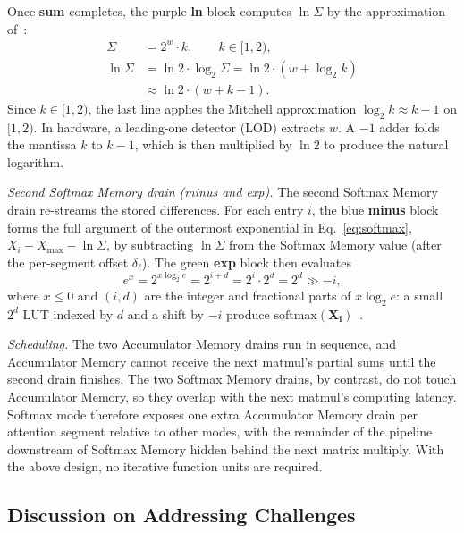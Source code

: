 \documentclass[lettersize,journal]{IEEEtran}
\begin{document}
Once \textbf{sum} completes, the purple \textbf{ln} block computes $\ln \Sigma$ by the approximation of~\cite{meiqi2018softmax}:
\begin{equation}
\begin{aligned}
    \Sigma      &= 2^{w} \cdot k, \qquad k \in [1, 2), \\
    \ln \Sigma  &= \ln 2 \cdot \log_{2} \Sigma = \ln 2 \cdot (w + \log_{2} k) \\
                &\approx \ln 2 \cdot (w + k - 1).
\end{aligned}
\label{eq:loge}
\end{equation}
Since $k \in [1, 2)$, the last line applies the Mitchell approximation $\log_{2} k \approx k - 1$ on $[1, 2)$. In hardware, a leading-one detector (LOD) extracts $w$. A $-1$ adder folds the mantissa $k$ to $k{-}1$, which is then multiplied by $\ln 2$ to produce the natural logarithm.

\emph{Second Softmax Memory drain (minus and exp).} The second Softmax Memory drain re-streams the stored differences. For each entry $i$, the blue \textbf{minus} block forms the full argument of the outermost exponential in Eq.~\eqref{eq:softmax}, $X_i - X_{\max} - \ln \Sigma$, by subtracting $\ln \Sigma$ from the Softmax Memory value (after the per-segment offset $\delta_{\ell}$). The green \textbf{exp} block then evaluates
\begin{equation}
    e^{x} = 2^{x \log_{2} e} = 2^{i+d} = 2^{i} \cdot 2^{d} = 2^{d} \gg -i,
    \label{eq:exp}
\end{equation}
where $x \le 0$ and $(i, d)$ are the integer and fractional parts of $x \log_{2} e$: a small $2^{d}$ LUT indexed by $d$ and a shift by $-i$ produce $\mathrm{softmax}(\mathbf{X_i})$~\cite{meiqi2018softmax}.

\emph{Scheduling.} The two Accumulator Memory drains run in sequence, and Accumulator Memory cannot %
receive the next matmul's partial sums until the second drain finishes. The two Softmax Memory drains, by contrast, do not touch Accumulator Memory, so they overlap with the next matmul's computing latency. Softmax mode therefore exposes one extra Accumulator Memory drain per attention segment relative to other modes, with the remainder of the pipeline downstream of Softmax Memory hidden behind the next matrix multiply. With the above design, no iterative function units are required.

\subsection{Discussion on Addressing Challenges}
\label{sec:arch-challenges}
\end{document}

